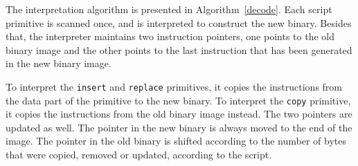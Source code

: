 The interpretation algorithm is presented in Algorithm~\ref{decode}.
Each script primitive is scanned once, and is interpreted to construct
the new binary. 
Besides that, the interpreter maintains two instruction pointers, one points to the old
binary image and the other points to the last instruction that has been generated
in the new binary image. 

To interpret the  {\tt insert} and {\tt replace} primitives, it copies the instructions from the data
part of the primitive to the new binary.  To interpret the {\tt copy} primitive, it copies
the instructions from the old binary image instead.
The two pointers are updated as well. The pointer in the new binary is always
moved to the end of the image. The pointer in the old binary is shifted according
to the number of bytes that were copied, removed or updated, according to the
script.


